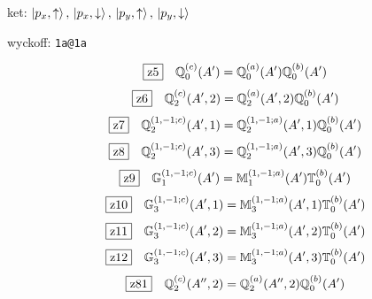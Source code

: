 \documentclass[fleqn,10pt,landscape]{jsarticle}
\begin{document}
\noindent\quad * ket: $\ket{p_{x},\uparrow},\, \ket{p_{x},\downarrow},\, \ket{p_{y},\uparrow},\, \ket{p_{y},\downarrow}$

\noindent\quad * wyckoff: \texttt{1a@1a}

\begin{dmath*}
\hspace*{3mm}\fbox{z5}\quad \mathbb{Q}_{0}^{(c)}(A^{\prime})=\mathbb{Q}_{0}^{(a)}(A^{\prime}) \mathbb{Q}_{0}^{(b)}(A^{\prime})
\end{dmath*}
\begin{dmath*}
\hspace*{3mm}\fbox{z6}\quad \mathbb{Q}_{2}^{(c)}(A^{\prime},2)=\mathbb{Q}_{2}^{(a)}(A^{\prime},2) \mathbb{Q}_{0}^{(b)}(A^{\prime})
\end{dmath*}
\begin{dmath*}
\hspace*{3mm}\fbox{z7}\quad \mathbb{Q}_{2}^{(1,-1;c)}(A^{\prime},1)=\mathbb{Q}_{2}^{(1,-1;a)}(A^{\prime},1) \mathbb{Q}_{0}^{(b)}(A^{\prime})
\end{dmath*}
\begin{dmath*}
\hspace*{3mm}\fbox{z8}\quad \mathbb{Q}_{2}^{(1,-1;c)}(A^{\prime},3)=\mathbb{Q}_{2}^{(1,-1;a)}(A^{\prime},3) \mathbb{Q}_{0}^{(b)}(A^{\prime})
\end{dmath*}
\begin{dmath*}
\hspace*{3mm}\fbox{z9}\quad \mathbb{G}_{1}^{(1,-1;c)}(A^{\prime})=\mathbb{M}_{1}^{(1,-1;a)}(A^{\prime}) \mathbb{T}_{0}^{(b)}(A^{\prime})
\end{dmath*}
\begin{dmath*}
\hspace*{3mm}\fbox{z10}\quad \mathbb{G}_{3}^{(1,-1;c)}(A^{\prime},1)=\mathbb{M}_{3}^{(1,-1;a)}(A^{\prime},1) \mathbb{T}_{0}^{(b)}(A^{\prime})
\end{dmath*}
\begin{dmath*}
\hspace*{3mm}\fbox{z11}\quad \mathbb{G}_{3}^{(1,-1;c)}(A^{\prime},2)=\mathbb{M}_{3}^{(1,-1;a)}(A^{\prime},2) \mathbb{T}_{0}^{(b)}(A^{\prime})
\end{dmath*}
\begin{dmath*}
\hspace*{3mm}\fbox{z12}\quad \mathbb{G}_{3}^{(1,-1;c)}(A^{\prime},3)=\mathbb{M}_{3}^{(1,-1;a)}(A^{\prime},3) \mathbb{T}_{0}^{(b)}(A^{\prime})
\end{dmath*}
\begin{dmath*}
\hspace*{3mm}\fbox{z81}\quad \mathbb{Q}_{2}^{(c)}(A^{\prime\prime},2)=\mathbb{Q}_{2}^{(a)}(A^{\prime\prime},2) \mathbb{Q}_{0}^{(b)}(A^{\prime})
\end{dmath*}
\end{document}
